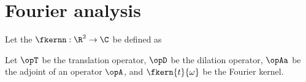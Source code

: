 \section{Fourier analysis}

\begin{definition}
\label{def:wav_fkern}
Let the  $\fkernn:\R^2\to\C$ be defined as 
\end{definition}

\begin{lemma}
\label{lem:TDk}
Let $\opT$ be the translation operator,
    $\opD$ be the dilation operator,
    $\opAa$ be the adjoint of an operator $\opA$,
and $\fkern{t}{\omega}$ be the Fourier kernel.
\end{lemma}
